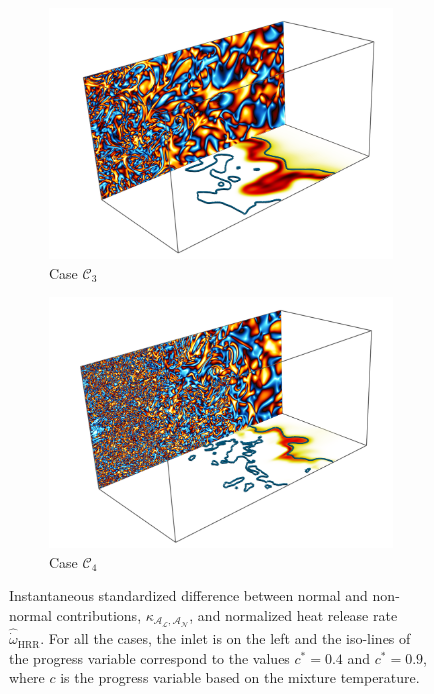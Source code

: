 \documentclass[review,times,sort&compress]{elsarticle}
\begin{document}
\begin{figure}[htpb]
\begin{subfigure}{.48\textwidth}
\centering
\includegraphics[width=.99\textwidth]{./figs/kappa/case3.pdf}
\caption{Case $\mathcal{C}_3$}
\label{fig:kappa_contour_case3}
\end{subfigure}
%
\begin{subfigure}{.48\textwidth}
\centering
\includegraphics[width=.99\textwidth]{./figs/kappa/case4.pdf}
\caption{Case $\mathcal{C}_4$}
\label{fig:kappa_contour_case4}
\end{subfigure}
\caption{Instantaneous standardized difference between normal and non-normal contributions, 
$\kappa_{\mathcal{A}_{\mathcal{L}}, \mathcal{A}_{\mathcal{N}}}$, and normalized heat release rate 
$\hat{\dot{\omega}}_{\mathrm{HRR}}$. For all the cases, the inlet is on the left and the iso-lines
of the progress variable correspond to the values $c^*=0.4$ and $c^*=0.9$, where $c$ is the progress
variable based on the mixture temperature.}
\label{fig:kappa_contour}
\end{figure}
\end{document}
